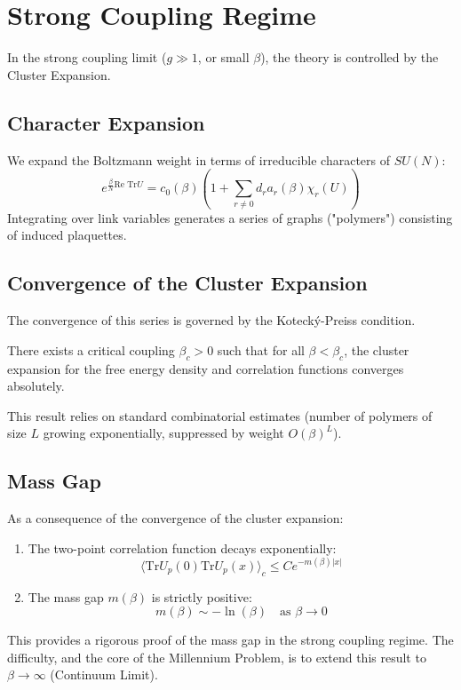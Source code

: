 \section{Strong Coupling Regime}
\label{sec:strong_coupling}

In the strong coupling limit ($g \gg 1$, or small $\beta$), the theory is controlled by the Cluster Expansion.

\subsection{Character Expansion}
We expand the Boltzmann weight in terms of irreducible characters of $SU(N)$:
\begin{equation}
e^{\frac{\beta}{N} \text{Re Tr} U} = c_0(\beta) \left( 1 + \sum_{r \neq 0} d_r a_r(\beta) \chi_r(U) \right)
\end{equation}
Integrating over link variables generates a series of graphs ("polymers") consisting of induced plaquettes.

\subsection{Convergence of the Cluster Expansion}
The convergence of this series is governed by the Koteck\'y-Preiss condition.
\begin{theorem}
There exists a critical coupling $\beta_c > 0$ such that for all $\beta < \beta_c$, the cluster expansion for the free energy density and correlation functions converges absolutely.
\end{theorem}
This result relies on standard combinatorial estimates (number of polymers of size $L$ growing exponentially, suppressed by weight $O(\beta)^L$).

\subsection{Mass Gap}
As a consequence of the convergence of the cluster expansion:
\begin{enumerate}
    \item The two-point correlation function decays exponentially:
    \begin{equation}
    \langle \text{Tr} U_p(0) \text{Tr} U_p(x) \rangle_c \le C e^{-m(\beta) |x|}
    \end{equation}
    \item The mass gap $m(\beta)$ is strictly positive:
    \begin{equation}
    m(\beta) \sim -\ln(\beta) \quad \text{as } \beta \to 0
    \end{equation}
\end{enumerate}
This provides a rigorous proof of the mass gap in the strong coupling regime. The difficulty, and the core of the Millennium Problem, is to extend this result to $\beta \to \infty$ (Continuum Limit).
